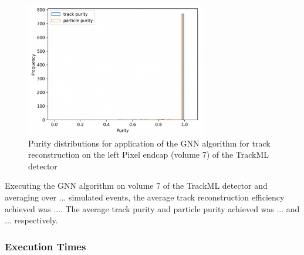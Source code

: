 

\begin{figure}[htbp]
    \centering
    \includegraphics[width=0.7\textwidth]{images/7-results/endcap-purity.png}
    \caption{Purity distributions for application of the GNN algorithm for track reconstruction on the left Pixel endcap (volume 7) of the TrackML detector}
    \label{fig:trackml-results-endcap-nodes-purity}%
\end{figure}

Executing the GNN algorithm on volume 7 of the TrackML detector and averaging over ... simulated events, the average track reconstruction efficiency achieved was .... The average track purity and particle purity achieved was  ... and ... respectively.



\subsubsection{Execution Times}

